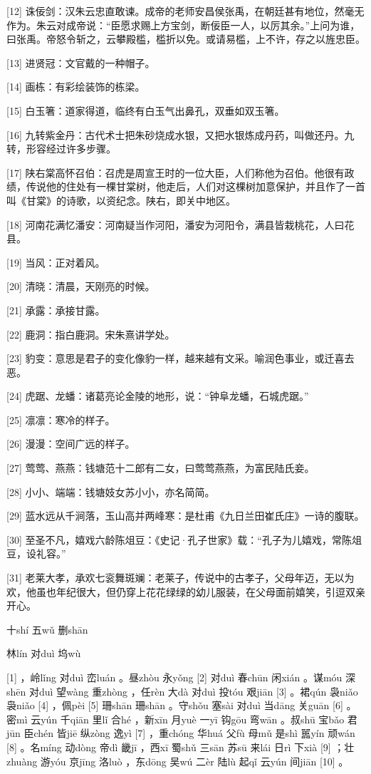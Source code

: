 \documentclass[12pt,UTF8]{ctexbook}
\begin{document}
[12] 诛佞剑：汉朱云忠直敢谏。成帝的老师安昌侯张禹，在朝廷甚有地位，然毫无作为。朱云对成帝说：“臣愿求赐上方宝剑，断佞臣一人，以厉其余。”上问为谁，曰张禹。帝怒令斩之，云攀殿槛，槛折以免。或请易槛，上不许，存之以旌忠臣。

[13] 进贤冠：文官戴的一种帽子。

[14] 画栋：有彩绘装饰的栋梁。

[15] 白玉箸：道家得道，临终有白玉气出鼻孔，双垂如双玉箸。

[16] 九转紫金丹：古代术士把朱砂烧成水银，又把水银炼成丹药，叫做还丹。九转，形容经过许多步骤。

[17] 陕右棠高怀召伯：召虎是周宣王时的一位大臣，人们称他为召伯。他很有政绩，传说他的住处有一棵甘棠树，他走后，人们对这棵树加意保护，并且作了一首叫《甘棠》的诗歌，以资纪念。陕右，即关中地区。

[18] 河南花满忆潘安：河南疑当作河阳，潘安为河阳令，满县皆栽桃花，人曰花县。

[19] 当风：正对着风。

[20] 清晓：清晨，天刚亮的时候。

[21] 承露：承接甘露。

[22] 鹿洞：指白鹿洞。宋朱熹讲学处。

[23] 豹变：意思是君子的变化像豹一样，越来越有文采。喻润色事业，或迁喜去恶。

[24] 虎踞、龙蟠：诸葛亮论金陵的地形，说：“钟阜龙蟠，石城虎踞。”

[25] 凛凛：寒冷的样子。

[26] 漫漫：空间广远的样子。

[27] 莺莺、燕燕：钱塘范十二郎有二女，曰莺莺燕燕，为富民陆氏妾。

[28] 小小、端端：钱塘妓女苏小小，亦名简简。

[29] 蓝水远从千涧落，玉山高并两峰寒：是杜甫《九日兰田崔氏庄》一诗的腹联。

[30] 至圣不凡，嬉戏六龄陈俎豆：《史记·孔子世家》载：“孔子为儿嬉戏，常陈俎豆，设礼容。”

[31] 老莱大孝，承欢七衮舞斑斓：老莱子，传说中的古孝子，父母年迈，无以为欢，他虽也年纪很大，但仍穿上花花绿绿的幼儿服装，在父母面前嬉笑，引逗双亲开心。





十shí 五wǔ 删shān


林lín 对duì 坞wù





[1] ，岭lǐng 对duì 峦luán 。昼zhòu 永yǒng [2] 对duì 春chūn 闲xián 。谋móu 深shēn 对duì 望wàng 重zhòng ，任rèn 大dà 对duì 投tóu 艰jiān [3] 。裙qún 袅niǎo 袅niǎo [4] ，佩pèi [5] 珊shān 珊shān 。守shǒu 塞sài 对duì 当dāng 关guān [6] 。密mì 云yún 千qiān 里lǐ 合hé ，新xīn 月yuè 一yī 钩gōu 弯wān 。叔shū 宝bǎo 君jūn 臣chén 皆jiē 纵zòng 逸yì [7] ，重chóng 华huá 父fù 母mǔ 是shì 嚚yín 顽wán [8] 。名míng 动dòng 帝dì 畿jī ，西xī 蜀shǔ 三sān 苏sū 来lái 日rì 下xià [9] ；壮zhuàng 游yóu 京jīng 洛luò ，东dōng 吴wú 二èr 陆lù 起qǐ 云yún 间jiān [10] 。
\end{document}
